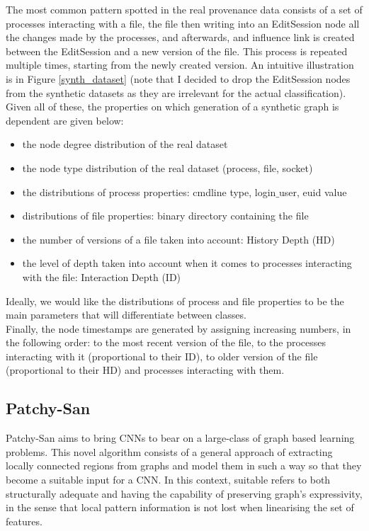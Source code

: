 The most common pattern spotted in the real provenance data consists of a set of processes interacting with a file, the file then writing into an EditSession node all the changes made by the processes, and afterwards, and influence link is created between the EditSession and a new version of the file. This process is repeated multiple times, starting from the newly created version. An intuitive illustration is in Figure \ref{synth_dataset} (note that I decided to drop the EditSession nodes from the synthetic datasets as they are irrelevant for the actual classification). Given all of these, the properties on which generation of a synthetic graph is dependent are given below:

\begin{itemize}
    \item the node degree distribution of the real dataset
    \item the node type distribution of the real dataset (process, file, socket)
    \item the distributions of process properties: cmdline type, login$\_$user, euid value
    \item distributions of file properties: binary directory containing the file
    \item the number of versions of a file taken into account: History Depth (HD)
    \item the level of depth taken into account when it comes to processes interacting with the file: Interaction Depth (ID)
\end{itemize}

Ideally, we would like the distributions of process and file properties to be the main parameters that will differentiate between classes. \\

Finally, the node timestamps are generated by assigning increasing numbers, in the following order: to the most recent version of the file, to the processes interacting with it (proportional to their ID), to older version of the file (proportional to their HD) and processes interacting with them. \\

\subsection{Patchy-San} \label{PCSN}

Patchy-San aims to bring CNNs to bear on a large-class of graph based learning problems. This novel algorithm consists of a general approach of extracting locally connected regions from graphs and model them in such a way so that they become a suitable input for a CNN. In this context, suitable refers to both structurally adequate and having the capability of preserving graph's expressivity, in the sense that local pattern information is not lost when linearising the set of features. \\


